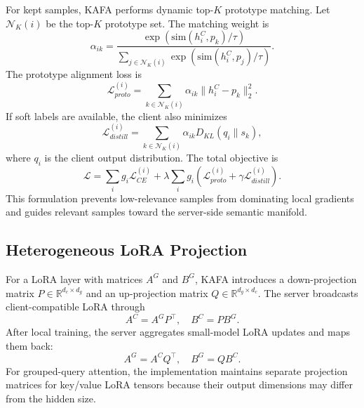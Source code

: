 \documentclass[conference]{IEEEtran}
\begin{document}
For kept samples, KAFA performs dynamic top-$K$ prototype matching. Let $\mathcal{N}_K(i)$ be the top-$K$ prototype set. The matching weight is
\begin{equation}
\alpha_{ik}=\frac{\exp(\mathrm{sim}(h_i^C,p_k)/\tau)}{\sum_{j\in\mathcal{N}_K(i)}\exp(\mathrm{sim}(h_i^C,p_j)/\tau)}.
\end{equation}
The prototype alignment loss is
\begin{equation}
\mathcal{L}_{proto}^{(i)}=\sum_{k\in\mathcal{N}_K(i)}\alpha_{ik}\|h_i^C-p_k\|_2^2.
\end{equation}
If soft labels are available, the client also minimizes
\begin{equation}
\mathcal{L}_{distill}^{(i)}=\sum_{k\in\mathcal{N}_K(i)}\alpha_{ik}D_{KL}(q_i\|s_k),
\end{equation}
where $q_i$ is the client output distribution. The total objective is
\begin{equation}
\mathcal{L}=\sum_i g_i\mathcal{L}_{CE}^{(i)} + \lambda\sum_i g_i\left(\mathcal{L}_{proto}^{(i)}+\gamma\mathcal{L}_{distill}^{(i)}\right).
\label{eq:loss}
\end{equation}
This formulation prevents low-relevance samples from dominating local gradients and guides relevant samples toward the server-side semantic manifold.

\subsection{Heterogeneous LoRA Projection}
For a LoRA layer with matrices $A^G$ and $B^G$, KAFA introduces a down-projection matrix $P\in\mathbb{R}^{d_c\times d_g}$ and an up-projection matrix $Q\in\mathbb{R}^{d_g\times d_c}$. The server broadcasts client-compatible LoRA through
\begin{equation}
A^C = A^G P^\top, \quad B^C = P B^G.
\end{equation}
After local training, the server aggregates small-model LoRA updates and maps them back:
\begin{equation}
A^G = A^C Q^\top, \quad B^G = Q B^C.
\end{equation}
For grouped-query attention, the implementation maintains separate projection matrices for key/value LoRA tensors because their output dimensions may differ from the hidden size.
\end{document}
